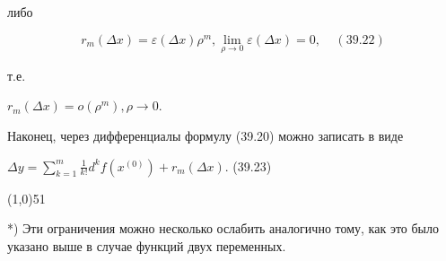 \documentclass[10 pt]{article}
\begin{document}
	либо 
	
	$$r_{m} (\Delta x) = \varepsilon (\Delta x) \rho^m, \lim_{\rho \to 0} \varepsilon(\Delta x) = 0, ~~~~~(39.22) $$
	
	\noindent т.е. 	
	\begin{center}
		$r_{m} (\Delta x) = o(\rho^m), \rho \to 0$.
	\end{center}

	Наконец, через дифференциалы формулу (39.20) можно записать в виде
	\begin{center}
		$\Delta y = \sum\limits_{k = 1}^{m} \frac{1}{k!} d^k f(x^{(0)}) + r_{m} (\Delta x) $. (39.23)
	\end{center}
	\line(1,0){51}

	*) Эти ограничения можно несколько ослабить аналогично тому, как это было указано выше в случае функций двух переменных.
		 
\end{document}
